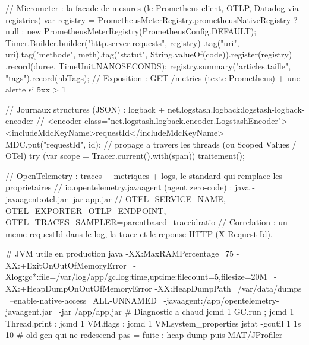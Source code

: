 \begin{codejava}
// Micrometer : la facade de mesures (le Prometheus client, OTLP, Datadog via registries)
var registry = PrometheusMeterRegistry.prometheusNativeRegistry ? null : new PrometheusMeterRegistry(PrometheusConfig.DEFAULT);
Timer.Builder.builder("http.server.requests", registry)
        .tag("uri", uri).tag("methode", meth).tag("statut", String.valueOf(code)).register(registry)
        .record(duree, TimeUnit.NANOSECONDS);
registry.summary("articles.taille", "tags").record(nbTags);
// Exposition : GET /metrics (texte Prometheus) + une alerte si 5xx > 1 %

// Journaux structures (JSON) : logback + net.logstash.logback:logstash-logback-encoder
//    <encoder class="net.logstash.logback.encoder.LogstashEncoder"><includeMdcKeyName>requestId</includeMdcKeyName>
MDC.put("requestId", id);                       // propage a travers les threads (ou Scoped Values / OTel)
try (var scope = Tracer.current().with(span)) { traitement(); }

// OpenTelemetry : traces + metriques + logs, le standard qui remplace les proprietaires
// io.opentelemetry.javaagent (agent zero-code) : java -javaagent:otel.jar -jar app.jar
//    OTEL_SERVICE_NAME, OTEL_EXPORTER_OTLP_ENDPOINT, OTEL_TRACES_SAMPLER=parentbased_traceidratio
// Correlation : un meme requestId dans le log, la trace et le reponse HTTP (X-Request-Id).
\end{codejava}

\begin{terminal}
# JVM utile en production
java -XX:MaxRAMPercentage=75 -XX:+ExitOnOutOfMemoryError \
     -Xlog:gc*:file=/var/log/app/gc.log:time,uptime:filecount=5,filesize=20M \
     -XX:+HeapDumpOnOutOfMemoryError -XX:HeapDumpPath=/var/data/dumps \
     --enable-native-access=ALL-UNNAMED \
     -javaagent:/app/opentelemetry-javaagent.jar \
     -jar /app/app.jar
# Diagnostic a chaud
jcmd 1 GC.run ; jcmd 1 Thread.print ; jcmd 1 VM.flags ; jcmd 1 VM.system_properties
jstat -gcutil 1 1s 10            # old gen qui ne redescend pas = fuite : heap dump puis MAT/JProfiler
\end{terminal}

